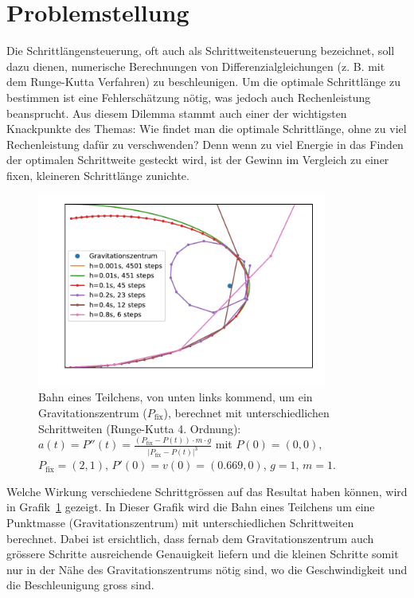 %
%
%
\section{Problemstellung
\label{steps:section:problemstellung}}
Die Schrittlängensteuerung, oft auch als Schrittweitensteuerung bezeichnet,
soll dazu dienen, numerische Berechnungen von Differenzialgleichungen (z. B. mit dem Runge-Kutta Verfahren) zu beschleunigen.
Um die optimale Schrittlänge zu bestimmen ist eine Fehlerschätzung nötig,
was jedoch auch Rechenleistung beansprucht.
Aus diesem Dilemma stammt auch einer der wichtigsten Knackpunkte des Themas:
Wie findet man die optimale Schrittlänge, ohne zu viel Rechenleistung dafür zu verschwenden?
Denn wenn zu viel Energie in das Finden der optimalen Schrittweite gesteckt wird,
ist der Gewinn im Vergleich zu einer fixen, kleineren Schrittlänge zunichte.

\begin{figure}
\centering
\includegraphics[width=0.85\textwidth]{papers/steps/img/gravity_different_fixed_stepsize.pdf}
\caption{Bahn eines Teilchens, von unten links kommend,
um ein Gravitationszentrum ($P_\text{fix}$), berechnet mit unterschiedlichen Schrittweiten (Runge-Kutta 4. Ordnung):
$a(t)=P''(t)=\frac{(P_\text{fix}-P(t))\cdot m\cdot g}{|P_\text{fix}-P(t)|^{3}}$
mit $P(0)=(0, 0)$, $P_\text{fix}=(2, 1)$, $P'(0)=v(0)=(0.669, 0)$, $g=1$, $m=1$.
\label{buch:steps:fixed_comparison}}
\end{figure}

Welche Wirkung verschiedene Schrittgrössen
auf das Resultat haben können, wird in Grafik~\ref{buch:steps:fixed_comparison} gezeigt.
In Dieser Grafik wird die Bahn eines Teilchens um eine Punktmasse (Gravitationszentrum)
mit unterschiedlichen Schrittweiten berechnet.
Dabei ist ersichtlich, dass fernab dem Gravitationszentrum auch grössere Schritte
ausreichende Genauigkeit liefern und die kleinen Schritte somit nur in der Nähe des Gravitationszentrums
nötig sind, wo die Geschwindigkeit und die Beschleunigung gross sind.




